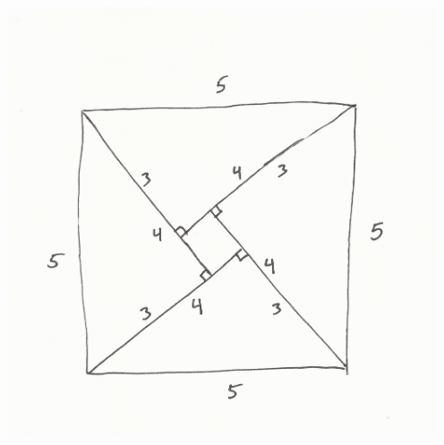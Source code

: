 \documentclass{article}
\begin{document}
\newpage

\begin{center}
\includegraphics[width=5in]{Square_drawing.jpg}
\end{center}
\end{document}
